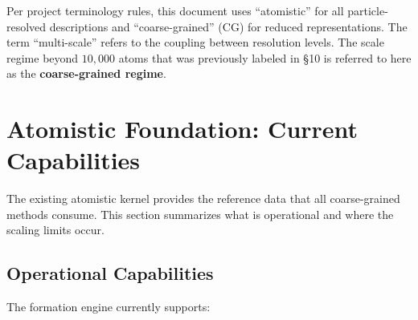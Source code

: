 \documentclass[11pt]{article}
\begin{document}
Per project terminology rules, this document uses ``atomistic'' for all
particle-resolved descriptions and ``coarse-grained'' (CG) for reduced
representations.  The term ``multi-scale'' refers to the coupling between
resolution levels.  The scale regime beyond $10{,}000$ atoms that was
previously labeled in \S10 is referred to here as the
\textbf{coarse-grained regime}.

\section{Atomistic Foundation: Current Capabilities}

The existing atomistic kernel provides the reference data that all
coarse-grained methods consume.  This section summarizes what is operational
and where the scaling limits occur.

\subsection{Operational Capabilities}

The formation engine currently supports:
\end{document}
